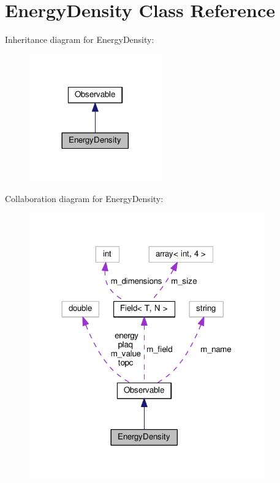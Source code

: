 \hypertarget{classEnergyDensity}{}\section{Energy\+Density Class Reference}
\label{classEnergyDensity}


Inheritance diagram for Energy\+Density\+:\nopagebreak
\begin{figure}[H]
\begin{center}
\leavevmode
\includegraphics[width=161pt]{classEnergyDensity__inherit__graph}
\end{center}
\end{figure}


Collaboration diagram for Energy\+Density\+:\nopagebreak
\begin{figure}[H]
\begin{center}
\leavevmode
\includegraphics[width=288pt]{classEnergyDensity__coll__graph}
\end{center}
\end{figure}
